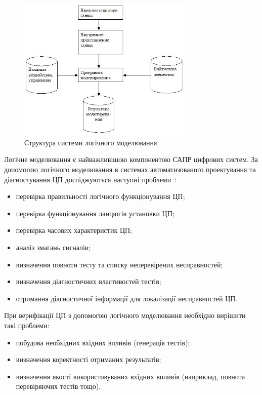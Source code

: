 \documentclass[12pt,a4paper]{article}
\begin{document}
\begin{figure}[h]
  \centering
    \includegraphics[width=0.75\textwidth]{03_01.jpg}
  \caption{Структура системи логічного моделювання\label{logicModStruct}}
\end{figure}

Логічне моделювання є найважливішою компонентою САПР цифрових систем. За допомогою логічного моделювання в системах автоматизованого проектування та діагностування ЦП досліджуються наступні проблеми~\cite{bib-logModNTest}:
\begin{itemize}
  \item перевірка правильності логічного функціонування ЦП;
  \item перевірка функціонування ланцюгів установки ЦП;
  \item перевірка часових характеристик ЦП;
  \item аналіз змагань сигналів;
  \item визначення повноти тесту та списку неперевірених несправностей;
  \item визначення діагностичних властивостей тестів;
  \item отримання діагностичної інформації для локалізації несправностей ЦП.
\end{itemize}

При верифікації ЦП з допомогою логічного моделювання необхідно вирішити такі проблеми:
\begin{itemize}
  \item побудова необхідних вхідних впливів (генерація тестів);
  \item визначення коректності отриманих результатів;
  \item визначення якості використовуваних вхідних впливів (наприклад, повнота перевіряючих тестів тощо).
\end{itemize}
\end{document}

